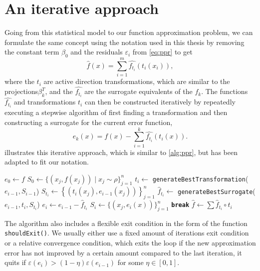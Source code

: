 \documentclass[
  a4paper,  %
  twoside,  %
  bibliography=totoc,
  headsepline,
  cleardoublepage=empty,
  parskip=half,
  draft=false
]{scrbook}
\begin{document}
\section{An iterative approach}
\label{sec:it}

Going from this statistical model to our function approximation problem, we can formulate the same concept using the notation used in this thesis by removing the constant term $\beta_0$ and the residuals $\varepsilon_i$ from \cref{eq:ppr} to get
\begin{equation}
\hat{f}(x)=\sum_{i=1}^m \hat{f_{t_i}}(t_i(x_i)),
\end{equation}
%
where the $t_i$ are active direction transformations, which are similar to the projections$\beta_k^T$, and the $\hat{f_{t_i}}$ are the surrogate equivalents of the $f_k$.
The functions $\hat{f_{t_i}}$ and transformations $t_i$ can then be constructed iteratively by repeatedly executing a stepwise algorithm of first finding a transformation and then constructing a surrogate for the current error function,
\begin{equation}
e_k(x)=f(x) - \sum_{i=1}^k \hat{f_{t_i}}(t_i(x)).
\end{equation}
%
 illustrates this iterative approach, which is similar to \cref{alg:ppr}, but has been adapted to fit our notation.

\begin{mdframed}[style=algstyle,frametitle={\textbf{function} \texttt{transformedSurrogateSum}{($f, n$)}}]
\normalsize
\vspace{5.5mm}
\begin{algorithmic}[1]
    \State $e_0 \gets f$
    \State $S_0 \gets \{\left(x_j, f(x_j)\right) \mid x_j \sim \rho \}_{j=1}^n$
    	\State $t_i \gets$ \texttt{generateBestTransformation}($e_{i - 1}, S_{i - 1}$)
    	\State $S_{t_i} \gets \left\{\left(t_i(x_j), e_{i - 1}(x_j)\right)\right\}_{j=1}^n$
    	\State $\hat{f}_{t_i} \gets$ \texttt{generateBestSurrogate}($e_{i - 1}, t_i, S_{t_i}$)
    	\State $e_i \gets e_{i - 1} - \hat{f}_{t_i}$
    	\State $S_i \gets \{\left(x_j, e_i(x)\right)\}_{j=1}^n$
    		\State  \textbf{\texttt{break}}
    	\EndIf
    \EndFor
    \State $\hat{f} \gets \sum \hat{f}_{t_i} \circ t_i$
    \State {}
\end{algorithmic}
\vspace{-1.5mm}
\delimit
	\label{alg:itappr}
\end{mdframed}
%
The algorithm also includes a flexible exit condition in the form of the function \texttt{shouldExit()}.
We usually either use a fixed amount of iterations exit condition or a relative convergence condition, which exits the loop if the new approximation error has not improved by a certain amount compared to the last iteration, \ie it quits if $\varepsilon(e_i) > (1 - \eta) \varepsilon(e_{i - 1})$ for some $\eta \in [0,1]$.
\end{document}

